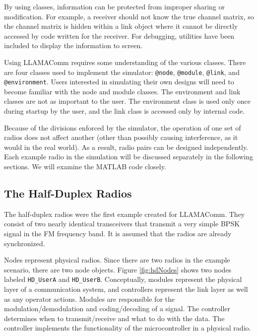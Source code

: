 By using classes, information can be protected from improper sharing
or modification.  For example, a receiver should not know the true
channel matrix, so the channel matrix is hidden within a link object
where it cannot be directly accessed by code written for the
receiver.  For debugging, utilities have been included to display
the information to screen.

Using LLAMAComm requires some understanding of the various classes.
There are four classes used to implement the simulator:
\verb+@node+, \verb+@module+, \verb+@link+, and \verb+@environment+.
Users interested in simulating their own designs will need to become
familiar with the node and module classes. The environment and link
classes are not as important to the user.  The environment class is
used only once during startup by the user, and the link class is
accessed only by internal code.

Because of the divisions enforced by the simulator, the operation of
one set of radios does not affect another (other than possibly
causing interference, as it would in the real world).  As a result,
radio pairs can be designed independently.  Each example radio in
the simulation will be discussed separately in the following
sections. We will examine the MATLAB code closely.

\subsection{The Half-Duplex Radios} \label{sec:hdExample}

The half-duplex radios were the first example created for LLAMAComm.
They consist of two nearly identical transceivers that transmit a
very simple BPSK signal in the FM frequency band.  It is assumed
that the radios are already synchronized.

Nodes represent physical radios.  Since there are two radios in the
example scenario, there are two node objects.  Figure
\ref{fig:hdNodes} shows two nodes labeled \verb+HD_UserA+ and
\verb+HD_UserB+.  Conceptually, modules represent the physical layer
of a communication system, and controllers represent the link layer
as well as any operator actions.  Modules are responsible for the
modulation/demodulation and coding/decoding of a signal.  The
controller determines when to transmit/receive and what to do with
the data.  The controller implements the functionality of the
microcontroller in a physical radio.

